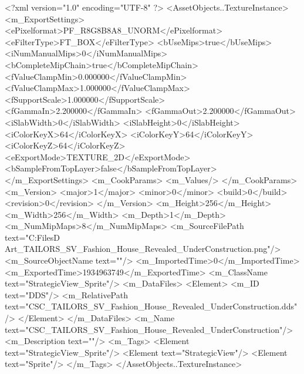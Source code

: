 <?xml version="1.0" encoding="UTF-8" ?>
<AssetObjects..TextureInstance>
	<m_ExportSettings>
		<ePixelformat>PF_R8G8B8A8_UNORM</ePixelformat>
		<eFilterType>FT_BOX</eFilterType>
		<bUseMips>true</bUseMips>
		<iNumManualMips>0</iNumManualMips>
		<bCompleteMipChain>true</bCompleteMipChain>
		<fValueClampMin>0.000000</fValueClampMin>
		<fValueClampMax>1.000000</fValueClampMax>
		<fSupportScale>1.000000</fSupportScale>
		<fGammaIn>2.200000</fGammaIn>
		<fGammaOut>2.200000</fGammaOut>
		<iSlabWidth>0</iSlabWidth>
		<iSlabHeight>0</iSlabHeight>
		<iColorKeyX>64</iColorKeyX>
		<iColorKeyY>64</iColorKeyY>
		<iColorKeyZ>64</iColorKeyZ>
		<eExportMode>TEXTURE_2D</eExportMode>
		<bSampleFromTopLayer>false</bSampleFromTopLayer>
	</m_ExportSettings>
	<m_CookParams>
		<m_Values/>
	</m_CookParams>
	<m_Version>
		<major>1</major>
		<minor>0</minor>
		<build>0</build>
		<revision>0</revision>
	</m_Version>
	<m_Height>256</m_Height>
	<m_Width>256</m_Width>
	<m_Depth>1</m_Depth>
	<m_NumMipMaps>8</m_NumMipMaps>
	<m_SourceFilePath text="C:\Users\Shadow\Desktop\Working Files\2D Art\Quarters\Tailors\StrategicView\CSC_TAILORS_SV_Fashion_House_Revealed_UnderConstruction.png"/>
	<m_SourceObjectName text=""/>
	<m_ImportedTime>0</m_ImportedTime>
	<m_ExportedTime>1934963749</m_ExportedTime>
	<m_ClassName text="StrategicView_Sprite"/>
	<m_DataFiles>
		<Element>
			<m_ID text="DDS"/>
			<m_RelativePath text="CSC_TAILORS_SV_Fashion_House_Revealed_UnderConstruction.dds"/>
		</Element>
	</m_DataFiles>
	<m_Name text="CSC_TAILORS_SV_Fashion_House_Revealed_UnderConstruction"/>
	<m_Description text=""/>
	<m_Tags>
		<Element text="StrategicView_Sprite"/>
		<Element text="StrategicView"/>
		<Element text="Sprite"/>
	</m_Tags>
</AssetObjects..TextureInstance>

